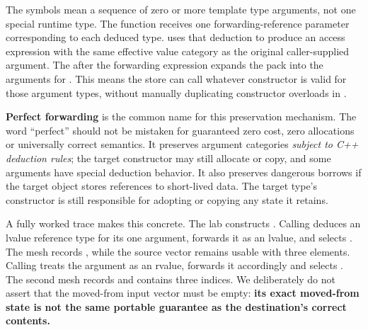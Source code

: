 The symbols  mean a sequence of zero or more template type arguments, not one special runtime type. The function receives one forwarding-reference parameter corresponding to each deduced type.  uses that deduction to produce an access expression with the same effective value category as the original caller-supplied argument. The  after the forwarding expression expands the pack into the arguments for . This means the store can call whatever  constructor is valid for those argument types, without manually duplicating constructor overloads in .

\textbf{Perfect forwarding} is the common name for this preservation mechanism. The word ``perfect'' should not be mistaken for guaranteed zero cost, zero allocations or universally correct semantics. It preserves argument categories \emph{subject to C++ deduction rules}; the target constructor may still allocate or copy, and some arguments have special deduction behavior. It also preserves dangerous borrows if the target object stores references to short-lived data. The target type's constructor is still responsible for adopting or copying any state it retains.

A fully worked trace makes this concrete. The lab constructs . Calling  deduces an lvalue reference type for its one argument, forwards it as an lvalue, and selects . The mesh records , while the source vector remains usable with three elements. Calling  treats the argument as an rvalue, forwards it accordingly and selects . The second mesh records  and contains three indices. We deliberately do not assert that the moved-from input vector must be empty: \textbf{its exact moved-from state is not the same portable guarantee as the destination's correct contents.}

